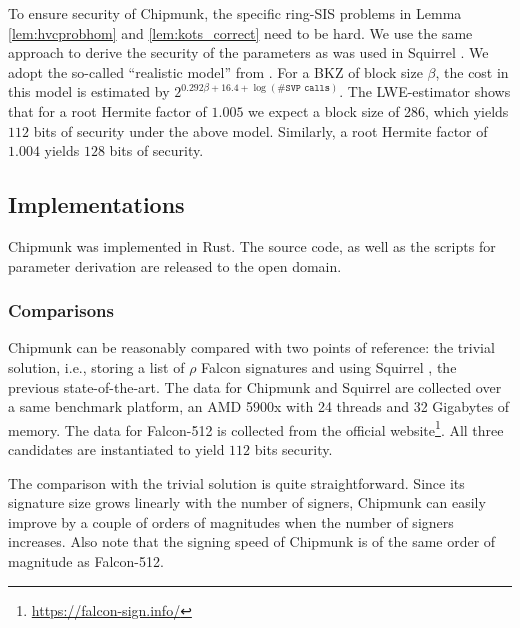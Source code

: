To ensure security of Chipmunk, the specific ring-SIS problems in Lemma \ref{lem:hvcprobhom} and \ref{lem:kots_correct} need to be hard.
We use the same approach to derive the security of the parameters as was used in Squirrel \cite{CCS:FleSimZha22}.
We adopt the so-called \enquote{realistic model} from \cite{USENIX:ADPS16}.
For a BKZ of block size $\beta$, the cost in this model is estimated by
$2^{0.292\beta+16.4+\log(\#\texttt{SVP calls})}$. 
The LWE-estimator \cite{DBLP:journals/jmc/AlbrechtPS15}
shows that for a root Hermite factor of $1.005$ we expect a block size of 286, which yields $112$ bits of security under the above model.
Similarly, a root Hermite factor of $1.004$ yields $128$ bits of security.

\subsection{Implementations}
Chipmunk was implemented in Rust. The source code, as well as the scripts for parameter derivation are released to the open domain.

\subsubsection{Comparisons}\label{ss:comparison}
Chipmunk can be reasonably compared with two points of reference:
the trivial solution, i.e., storing a list of $\rho$ Falcon signatures and using
Squirrel \cite{CCS:FleSimZha22}, the previous state-of-the-art.
The data for Chipmunk and Squirrel are collected over a same benchmark platform, an AMD 5900x with 24 threads and 32 Gigabytes of memory.
The data for Falcon-512 is collected from the official website\footnote{\url{https://falcon-sign.info/}}.
All three candidates are instantiated to yield $112$ bits security.

The comparison with the trivial solution is quite straightforward.
Since its signature size grows linearly with the number of signers,
Chipmunk can easily improve by a couple of orders of magnitudes when the number of signers increases.
Also note that the signing speed of Chipmunk is of the same order of magnitude as Falcon-512.

